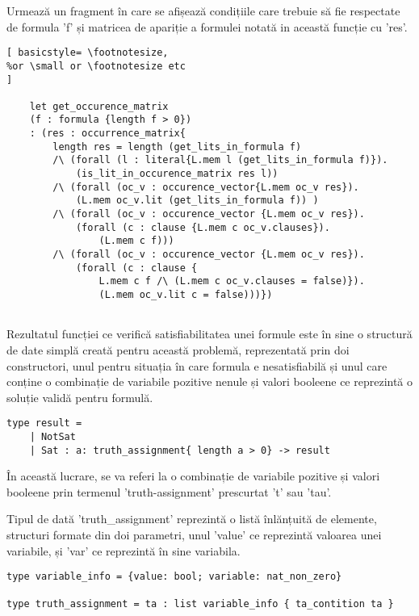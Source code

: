 Urmează un fragment în care se afișează condițiile care trebuie să fie respectate de formula 'f' și matricea de apariție a formulei notată in această funcție cu 'res'.

\begin{lstlisting}[	basicstyle= \footnotesize, 
%or \small or \footnotesize etc
]
	
	let get_occurence_matrix 
	(f : formula {length f > 0}) 
	: (res : occurrence_matrix{
		length res = length (get_lits_in_formula f)
		/\ (forall (l : literal{L.mem l (get_lits_in_formula f)}). 
			(is_lit_in_occurence_matrix res l))
		/\ (forall (oc_v : occurence_vector{L.mem oc_v res}). 	
			(L.mem oc_v.lit (get_lits_in_formula f)) )
		/\ (forall (oc_v : occurence_vector {L.mem oc_v res}). 
			(forall (c : clause {L.mem c oc_v.clauses}). 
				(L.mem c f)))
		/\ (forall (oc_v : occurence_vector {L.mem oc_v res}). 
			(forall (c : clause {
				L.mem c f /\ (L.mem c oc_v.clauses = false)}). 
				(L.mem oc_v.lit c = false)))})
	
\end{lstlisting}

Rezultatul funcției ce verifică satisfiabilitatea unei formule este în sine o structură de date simplă creată pentru această problemă, reprezentată prin doi constructori, unul pentru situația în care formula e nesatisfiabilă și unul care conține o combinație de variabile pozitive nenule și valori booleene ce reprezintă o soluție validă pentru formulă. 

\newpage
\begin{lstlisting}[]
type result =
	| NotSat
	| Sat : a: truth_assignment{ length a > 0} -> result

\end{lstlisting}

În această lucrare, se va referi la o combinație de variabile pozitive și valori \newline booleene prin termenul 'truth-assignment' prescurtat 't' sau 'tau'.

Tipul de dată 'truth\_assignment' reprezintă o listă înlănțuită de elemente, structuri formate din doi parametri, unul 'value' ce reprezintă valoarea unei variabile, și 'var' ce reprezintă în sine variabila.

\begin{lstlisting}[]
type variable_info = {value: bool; variable: nat_non_zero}

type truth_assignment = ta : list variable_info { ta_contition ta }
\end{lstlisting}

